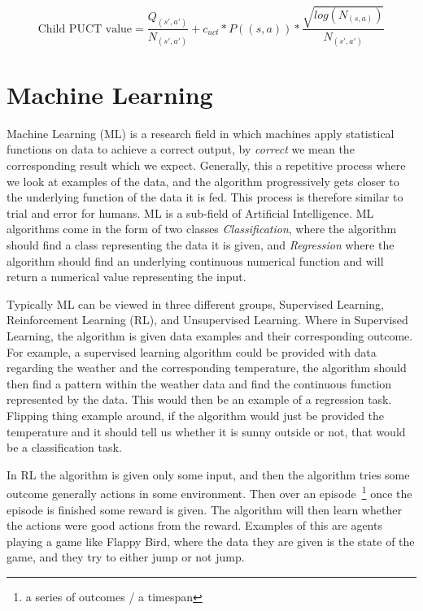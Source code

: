 \begin{equation} \label{PUCT_formula}
  \text{Child PUCT value} = \frac{Q_{(s',a')}}{N_{(s',a')}} + c_{uct} * P((s,a)) * \frac{\sqrt{log(N_{(s,a)})}}{N_{(s',a')}}
\end{equation}

\section{Machine Learning}

Machine Learning (ML) is a research field in which machines apply statistical functions on data to achieve a correct output, by \textit{correct} we mean the corresponding result which we expect. Generally, this a repetitive process where we look at examples of the data, and the algorithm progressively gets closer to the underlying function of the data it is fed. This process is therefore similar to trial and error for humans. ML is a sub-field of Artificial Intelligence. ML algorithms come in the form of two classes \textit{Classification}, where the algorithm should find a class representing the data it is given, and \textit{Regression} where the algorithm should find an underlying continuous numerical function and will return a numerical value representing the input.

Typically ML can be viewed in three different groups, Supervised Learning, Reinforcement Learning (RL), and Unsupervised Learning. Where in Supervised Learning, the algorithm is given data examples and their corresponding outcome. For example, a supervised learning algorithm could be provided with data regarding the weather and the corresponding temperature, the algorithm should then find a pattern within the weather data and find the continuous function represented by the data. This would then be an example of a regression task. Flipping thing example around, if the algorithm would just be provided the temperature and it should tell us whether it is sunny outside or not, that would be a classification task.

In RL the algorithm is given only some input, and then the algorithm tries some outcome generally actions in some environment. Then over an episode~\footnote{a series of outcomes / a timespan} once the episode is finished some reward is given. The algorithm will then learn whether the actions were good actions from the reward. Examples of this are agents playing a game like Flappy Bird, where the data they are given is the state of the game, and they try to either jump or not jump.

